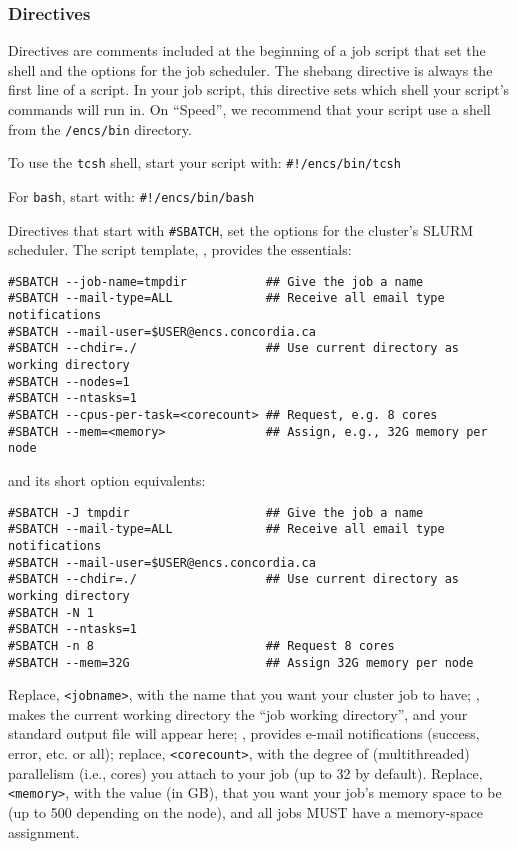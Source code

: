 ﻿%
\subsubsection{Directives}
\label{sect:directives}

Directives are comments included at the beginning of a job script that set the shell 
and the options for the job scheduler. 
%
The shebang directive is always the first line of a script. In your job script, 
this directive sets which shell your script's commands will run in. On ``Speed'', 
we recommend that your script use a shell from the \texttt{/encs/bin} directory. 

To use the \texttt{tcsh} shell, start your script with: \verb|#!/encs/bin/tcsh|

For \texttt{bash}, start with: \verb|#!/encs/bin/bash|

Directives that start with \verb|#SBATCH|, set the options for the cluster's 
SLURM scheduler. The script template, , 
provides the essentials:

\begin{verbatim}
#SBATCH --job-name=tmpdir           ## Give the job a name
#SBATCH --mail-type=ALL             ## Receive all email type notifications
#SBATCH --mail-user=$USER@encs.concordia.ca
#SBATCH --chdir=./                  ## Use current directory as working directory
#SBATCH --nodes=1
#SBATCH --ntasks=1
#SBATCH --cpus-per-task=<corecount> ## Request, e.g. 8 cores
#SBATCH --mem=<memory>              ## Assign, e.g., 32G memory per node 
\end{verbatim}

and its short option equivalents:

\begin{verbatim}
#SBATCH -J tmpdir                   ## Give the job a name
#SBATCH --mail-type=ALL             ## Receive all email type notifications
#SBATCH --mail-user=$USER@encs.concordia.ca
#SBATCH --chdir=./                  ## Use current directory as working directory
#SBATCH -N 1
#SBATCH --ntasks=1
#SBATCH -n 8                        ## Request 8 cores
#SBATCH --mem=32G                   ## Assign 32G memory per node 
\end{verbatim}

Replace, \verb+<jobname>+, with the name that you want your cluster job to have;
, makes the current working directory the ``job working directory'',
and your standard output file will appear here; , provides e-mail
notifications (success, error, etc. or all); replace, \verb+<corecount>+, with the degree of
(multithreaded) parallelism (i.e., cores) you attach to your job (up to 32 by default).
Replace, \verb+<memory>+, with the value (in GB), that you want 
your job's memory space to be (up to 500 depending on the node), and all jobs MUST have a memory-space 
assignment.

